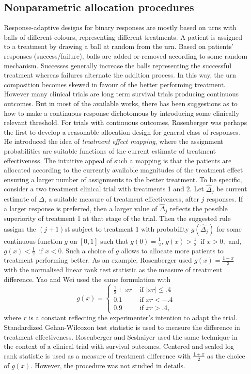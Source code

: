 \subsection{Nonparametric allocation procedures}

Response-adaptive designs for binary responses are mostly based on urns with balls of different colours, representing different treatments. A patient is assigned to a treatment by drawing a ball at random from the urn. Based on patients' responses (success/failure), balls are added or removed according to some random mechanism. Successes generally increase the balls
representing the successful treatment whereas failures alternate the
addition process. In this way, the urn composition becomes skewed in
favour of the better performing treatment. However many clinical
trials are long term survival trials producing continuous outcomes.
But in most of the available works, there has been suggestions as to
how to make a continuous response dichotomous by introducing some
clinically relevant threshold\cite{22,28}. For trials with continuous outcomes, Rosenberger\cite{29} was perhaps the first to develop a reasonable allocation design for general class of responses. He introduced the idea of \textit{treatment effect mapping}, where the assignment probabilities are suitable functions of the current estimate of treatment effectiveness. The
intuitive appeal of such a mapping is that the patients are
allocated according to the currently available magnitudes of the
treatment effect ensuring a larger number of assignments to the
better treatment. To be specific, consider a two treatment clinical
trial with treatments 1 and 2. Let ${\hat\Delta}_{j}$ be current estimate of $\Delta$, a suitable measure of treatment effectiveness, after $j$ responses. If a larger response is preferred, then a larger value of ${\hat\Delta}_{j}$ reflects the possible superiority
of treatment 1 at that stage of the trial. Then the suggested rule
assigns the $(j+1)$st subject to treatment 1 with probability
$g({\hat\Delta}_{j})$ for some continuous function $g$ on $[0,1]$ such that $g(0)=\frac{1}{2}$, $g(x)>\frac{1}{2} ~ \mbox{ if } x>0,$ and,
$g(x)< \frac{1}{2} ~ \mbox{ if } x<0.$ Such a choice
of $g$ allows to allocate more patients to treatment performing
better. As an example, Rosenberger\cite{29} used $g(x)=\frac{1+x}{2}$
with the normalised linear rank test statistic as the measure of
treatment difference. Yao and Wei\cite{3} used the same formulation
with
\[g(x) = \left\{
\begin{array}{ll}
\frac{1}{2}+ xr & \mbox{ if } |xr|\leq .4\\
0.1 & \mbox{ if } xr<-.4 \\
0.9 & \mbox{ if } xr>.4,
\end{array}
\right. \]
where $r$ is a constant reflecting the experimenter's intention to
adapt the trial. Standardized Gehan-Wilcoxon test statistic is used
to measure the difference in treatment effectiveness. Rosenberger
and Seshaiyer\cite{30} used the same technique in the context of a
clinical trial with survival outcomes. Centered and scaled log rank
statistic is used as a measure of treatment difference with
$\frac{1+x}{2}$ as the choice of $g(x)$. However, the procedure
was not studied in details.


